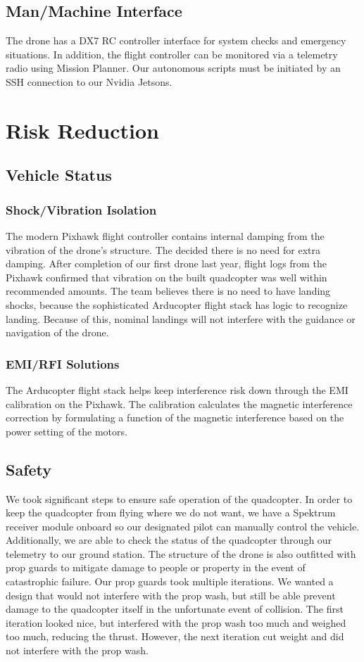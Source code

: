 \documentclass[12pt,letterpaper]{article}
\begin{document}
	\subsection*{Man/Machine Interface}
		The drone has a DX7 RC controller interface for system checks and emergency situations. In addition, the flight controller can be monitored via a telemetry radio using Mission Planner. Our autonomous scripts must be initiated by an SSH connection to our Nvidia Jetsons.

\section*{Risk Reduction}
	\subsection*{Vehicle Status}
		\subsubsection*{Shock/Vibration Isolation}
		The modern Pixhawk flight controller contains internal damping from the vibration of the drone's structure. The decided there is no need for extra damping. After completion of our first drone last year, flight logs from the Pixhawk confirmed that vibration on the built quadcopter was well within recommended amounts. The team believes there is no need to have landing shocks, because the sophisticated Arducopter flight stack has logic to recognize landing. Because of this, nominal landings will not interfere with the guidance or navigation of the drone.

		\subsubsection*{EMI/RFI Solutions}
		The Arducopter flight stack helps keep interference risk down through the EMI calibration on the Pixhawk. The calibration calculates the magnetic interference correction by formulating a function of the magnetic interference based on the power setting of the motors.


	\subsection*{Safety}
		We took significant steps to ensure safe operation of the quadcopter. In order to keep the quadcopter from flying where we do not want, we have a Spektrum receiver module onboard so our designated pilot can manually control the vehicle. Additionally, we are able to check the status of the quadcopter through our telemetry to our ground station. The structure of the drone is also outfitted with prop guards to mitigate damage to people or property in the event of catastrophic failure. Our prop guards took multiple iterations. We wanted a design that would not interfere with the prop wash, but still be able prevent damage to the quadcopter itself in the unfortunate event of collision. The first iteration looked nice, but interfered with the prop wash too much and weighed too much, reducing the thrust. However, the next iteration cut weight and did not interfere with the prop wash.
\end{document}
